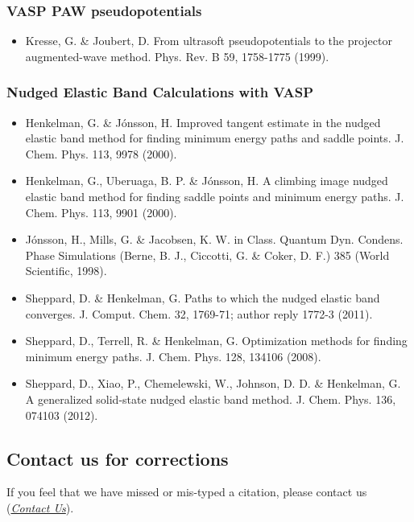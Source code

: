 \documentclass[letterpaper,10pt,english]{sphinxmanual}
\begin{document}
\subsubsection{VASP PAW pseudopotentials}
\label{15_0_citations:vasp-paw-pseudopotentials}\begin{itemize}
\item {} 
Kresse, G. \& Joubert, D. From ultrasoft pseudopotentials to the projector augmented-wave method. Phys. Rev. B 59, 1758-1775 (1999).

\end{itemize}


\subsubsection{Nudged Elastic Band Calculations with VASP}
\label{15_0_citations:nudged-elastic-band-calculations-with-vasp}\begin{itemize}
\item {} 
Henkelman, G. \& Jónsson, H. Improved tangent estimate in the nudged elastic band method for finding minimum energy paths and saddle points. J. Chem. Phys. 113, 9978 (2000).

\item {} 
Henkelman, G., Uberuaga, B. P. \& Jónsson, H. A climbing image nudged elastic band method for finding saddle points and minimum energy paths. J. Chem. Phys. 113, 9901 (2000).

\item {} 
Jónsson, H., Mills, G. \& Jacobsen, K. W. in Class. Quantum Dyn. Condens. Phase Simulations (Berne, B. J., Ciccotti, G. \& Coker, D. F.) 385 (World Scientific, 1998).

\item {} 
Sheppard, D. \& Henkelman, G. Paths to which the nudged elastic band converges. J. Comput. Chem. 32, 1769-71; author reply 1772-3 (2011).

\item {} 
Sheppard, D., Terrell, R. \& Henkelman, G. Optimization methods for finding minimum energy paths. J. Chem. Phys. 128, 134106 (2008).

\item {} 
Sheppard, D., Xiao, P., Chemelewski, W., Johnson, D. D. \& Henkelman, G. A generalized solid-state nudged elastic band method. J. Chem. Phys. 136, 074103 (2012).

\end{itemize}


\subsection{Contact us for corrections}
\label{15_0_citations:contact-us-for-corrections}
If you feel that we have missed or mis-typed a citation, please contact us ({\hyperref[14_0_contact::doc]{\emph{Contact Us}}}).
\end{document}

